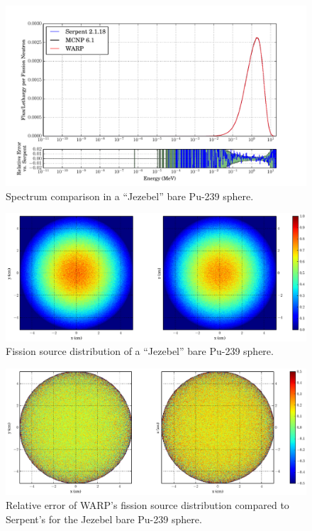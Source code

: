 \begin{figure}[h!] 
\centering
\includegraphics[width=\textwidth,trim= 1cm 0cm 1cm 0cm]{graphics/finalresults/godiva_spec-6.pdf}
\caption{Spectrum comparison in a ``Jezebel'' bare Pu-239 sphere. \label{godiva_spec} }
\end{figure}

\begin{figure}[h!]
\centering
\includegraphics[width=\textwidth,trim= 5cm 0cm 7cm 0cm]{graphics/finalresults/godiva_fiss-6.eps}
\caption{Fission source distribution of a ``Jezebel'' bare Pu-239 sphere. \label{godiva_fiss} }
\end{figure}

\begin{figure}[h!]
\centering
\includegraphics[width=\textwidth,trim= 5cm 0cm 7cm 0cm]{graphics/finalresults/godiva_fiss_diff-6.eps}
\caption{Relative error of WARP's fission source distribution compared to Serpent's for the Jezebel bare Pu-239 sphere. \label{godiva_fiss_diff} }
\end{figure}

